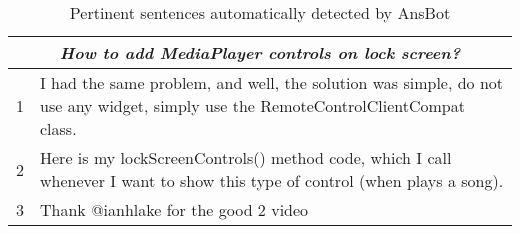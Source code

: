 
\begin{table}[H]
\centering    
\begin{scriptsize}
\begin{threeparttable}
\begin{tabular}{ll}

\hline
\multicolumn{2}{c}{\textit{How to add MediaPlayer controls on lock screen?}} \\
\hline
\hline

1 & \parbox[l][.8cm][c]{10.5cm}{I had the same problem, and well, the solution was simple, do not use any widget, simply use the RemoteControlClientCompat class.} \\
2 & \parbox[l][.8cm][c]{10.5cm}{Here is my lockScreenControls() method code, which I call whenever I want to show this type of control (when plays a song).} \\
3 & \parbox[l][.5cm][c]{10.5cm}{Thank @ianhlake for the good 2 video} \\

\hline


\end{tabular}
\end{threeparttable}
\end{scriptsize}
\caption{Pertinent sentences automatically detected by \acs{AnsBot}}
\label{tbl:git-example-ansbot}
\end{table}
